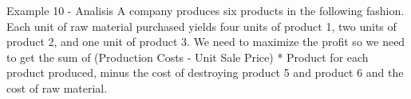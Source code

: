 \begin{frame}{Example 10 - Analisis}
A company produces six products in the following fashion. Each unit of raw material purchased yields four units of product 1,
two units of product 2, and one unit of product 3.  We need to maximize the profit so we need
to get the sum of (Production Costs - Unit Sale Price) * Product for each product produced,
minus the cost of destroying product 5 and product 6 and the cost of raw material.
\end{frame}
